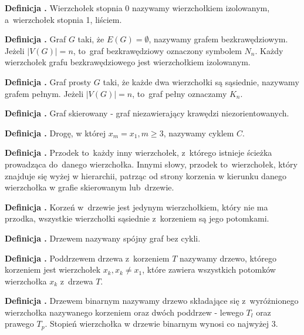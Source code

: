 \noindent
\textbf{Definicja .}
\incrementdefinitionIndex
Wierzchołek stopnia 0 nazywamy wierzchołkiem izolowanym, a~wierzchołek stopnia 1, liściem.

\noindent
\textbf{Definicja .}
\incrementdefinitionIndex
Graf $G$ taki, że $E(G) = \emptyset$, nazywamy grafem bezkrawędziowym. Jeżeli $|V(G)| = n$, to~graf bezkrawędziowy oznaczony symbolem $N_n$.
Każdy wierzchołek grafu bezkrawędziowego jest wierzchołkiem izolowanym.

\noindent
\textbf{Definicja .}
\incrementdefinitionIndex
Graf prosty $G$ taki, że każde dwa wierzchołki są sąsiednie, nazywamy grafem pełnym.
Jeżeli $|V(G)| = n$, to~graf pełny oznaczamy $K_n$.

\noindent
\textbf{Definicja .}
\incrementdefinitionIndex
Graf skierowany - graf niezawierający krawędzi niezorientowanych.

\noindent
\textbf{Definicja .}
\incrementdefinitionIndex
Drogę, w której $x_m = x_1, m \geqslant 3$, nazywamy cyklem $C$.

\noindent
\textbf{Definicja .}
\incrementdefinitionIndex
Przodek to~każdy inny wierzchołek, z~którego istnieje ścieżka prowadząca do~danego wierzchołka.
Innymi słowy, przodek to~wierzchołek, który znajduje się wyżej w hierarchii,
patrząc od strony korzenia w kierunku danego wierzchołka w grafie skierowanym lub~drzewie.

\noindent
\textbf{Definicja .}
\incrementdefinitionIndex
Korzeń w~drzewie jest jedynym wierzchołkiem,
który nie ma przodka, wszystkie wierzchołki sąsiednie z~korzeniem są jego potomkami.

\noindent
\textbf{Definicja .}
\incrementdefinitionIndex
Drzewem nazywany spójny graf bez cykli.

\noindent
\textbf{Definicja .}
\incrementdefinitionIndex
Poddrzewem drzewa z~korzeniem $T$ nazywamy drzewo, którego korzeniem jest wierzchołek $x_k, x_k \neq x_1$,
które zawiera wszystkich potomków wierzchołka $x_k$ z~drzewa $T$.

\noindent
\textbf{Definicja .}
\incrementdefinitionIndex
Drzewem binarnym nazywamy drzewo składające się z~wyróżnionego wierzchołka nazywanego korzeniem oraz dwóch poddrzew
- lewego $T_l$ oraz prawego $T_p$. Stopień wierzchołka w drzewie binarnym wynosi co najwyżej 3.